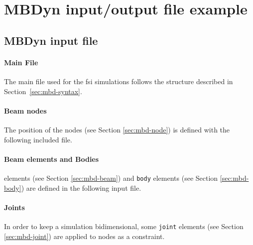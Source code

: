 \chapter{MBDyn input/output file example}
\label{app:mbdyn-file}

\section{MBDyn input file}
\label{sec:mbdyn-input-file}

\subsubsection{Main File}

The main file used for the \acrshort{fsi} simulations follows the structure described in Section~\ref{sec:mbd-syntax}.



\subsubsection{Beam nodes}

The position of the nodes (see Section \ref{sec:mbd-node}) is defined with the following included file.



\subsubsection{Beam elements and Bodies}

 elements (see Section \ref{sec:mbd-beam}) and \texttt{body} elements (see Section \ref{sec:mbd-body}) are defined in the following input file.



\newpage

\subsubsection{Joints}

In order to keep a simulation bidimensional, some \texttt{joint} elements (see Section \ref{sec:mbd-joint}) are applied to nodes as a constraint.

